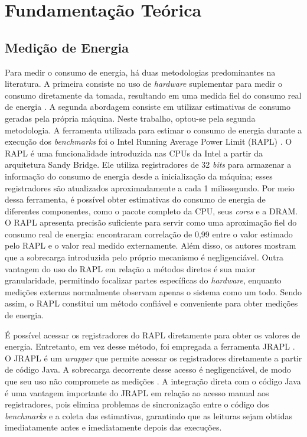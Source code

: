 \chapter{Fundamentação Teórica}

\section{Medição de Energia}

Para medir o consumo de energia, há duas metodologias predominantes na
literatura. A primeira consiste no uso de \textit{hardware} suplementar para
medir o consumo diretamente da tomada, resultando em uma medida fiel do consumo
real de energia \cite{energy-java-collections-hasan}. A segunda abordagem
consiste em utilizar estimativas de consumo geradas pela própria máquina. Neste
trabalho, optou-se pela segunda metodologia. A ferramenta utilizada para
estimar o consumo de energia durante a execução dos \textit{benchmarks} foi o
Intel Running Average Power Limit (RAPL) \cite{rapl}. O RAPL é uma
funcionalidade introduzida nas CPUs da Intel a partir da arquitetura Sandy
Bridge. Ele utiliza registradores de 32 \textit{bits} para armazenar a
informação do consumo de energia desde a inicialização da máquina; esses
registradores são atualizados aproximadamente a cada 1 milissegundo. Por meio
dessa ferramenta, é possível obter estimativas do consumo de energia de
diferentes componentes, como o pacote completo da CPU, seus \textit{cores} e a
DRAM. O RAPL apresenta precisão suficiente para servir como uma aproximação
fiel do consumo real de energia:  encontraram
correlação de 0,99 entre o valor estimado pelo RAPL e o valor real medido
externamente. Além disso, os autores mostram que a sobrecarga introduzida pelo
próprio mecanismo é negligenciável. Outra vantagem do uso do RAPL em relação a
métodos diretos é sua maior granularidade, permitindo focalizar partes
específicas do \textit{hardware}, enquanto medições externas normalmente
observam apenas o sistema como um todo. Sendo assim, o RAPL constitui um método
confiável e conveniente para obter medições de energia.

É possível acessar os registradores do RAPL diretamente para obter os valores
de energia. Entretanto, em vez desse método, foi empregada a ferramenta JRAPL
\cite{jrapl}. O JRAPL é um \textit{wrapper} que permite acessar os
registradores diretamente a partir de código Java. A sobrecarga decorrente
desse acesso é negligenciável, de modo que seu uso não compromete as medições
\cite{programming_lang_energy}. A integração direta com o código Java é uma
vantagem importante do JRAPL em relação ao acesso manual aos registradores, pois
elimina problemas de sincronização entre o código dos \textit{benchmarks} e a
coleta das estimativas, garantindo que as leituras sejam obtidas imediatamente
antes e imediatamente depois das execuções.

